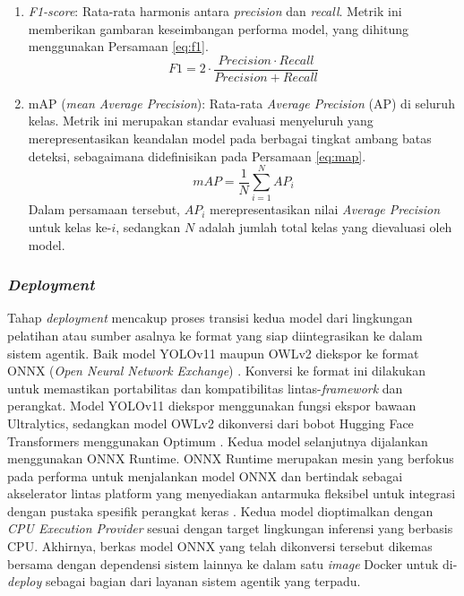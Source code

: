 \begin{enumerate}[nosep]
    \item \textit{F1-score}: Rata-rata harmonis antara \textit{precision} dan \textit{recall}. Metrik ini memberikan gambaran keseimbangan performa model, yang dihitung menggunakan Persamaan \ref{eq:f1}.
    \begin{equation}
        F1 = 2 \cdot \frac{Precision \cdot Recall}{Precision + Recall}
        \label{eq:f1}
    \end{equation}

    \item mAP (\textit{mean Average Precision}): Rata-rata \textit{Average Precision} (AP) di seluruh kelas. Metrik ini merupakan standar evaluasi menyeluruh yang merepresentasikan keandalan model pada berbagai tingkat ambang batas deteksi, sebagaimana didefinisikan pada Persamaan \ref{eq:map}.
    \begin{equation}
        mAP = \frac{1}{N} \sum_{i=1}^{N} AP_i
        \label{eq:map}
    \end{equation}
    Dalam persamaan tersebut, $AP_i$ merepresentasikan nilai \textit{Average Precision} untuk kelas ke-$i$, sedangkan $N$ adalah jumlah total kelas yang dievaluasi oleh model.
\end{enumerate}

\subsubsection{\textit{Deployment}}
Tahap \textit{deployment} mencakup proses transisi kedua model dari lingkungan pelatihan atau sumber asalnya ke format yang siap diintegrasikan ke dalam sistem agentik. Baik model YOLOv11 maupun OWLv2 diekspor ke format ONNX (\textit{Open Neural Network Exchange}) \parencite{onnx2026}. Konversi ke format ini dilakukan untuk memastikan portabilitas dan kompatibilitas lintas-\textit{framework} dan perangkat. Model YOLOv11 diekspor menggunakan fungsi ekspor bawaan Ultralytics, sedangkan model OWLv2 dikonversi dari bobot Hugging Face Transformers menggunakan Optimum \parencite{huggingface_optimum_onnx2026}. Kedua model selanjutnya dijalankan menggunakan ONNX Runtime. ONNX Runtime merupakan mesin yang berfokus pada performa untuk menjalankan model ONNX dan bertindak sebagai akselerator lintas platform yang menyediakan antarmuka fleksibel untuk integrasi dengan pustaka spesifik perangkat keras \parencite{rothmanRAGDrivenGenerativeAI2024}. Kedua model dioptimalkan dengan \textit{CPU Execution Provider} sesuai dengan target lingkungan inferensi yang berbasis CPU. Akhirnya, berkas model ONNX yang telah dikonversi tersebut dikemas bersama dengan dependensi sistem lainnya ke dalam satu \textit{image} Docker untuk di-\textit{deploy} sebagai bagian dari layanan sistem agentik yang terpadu.

